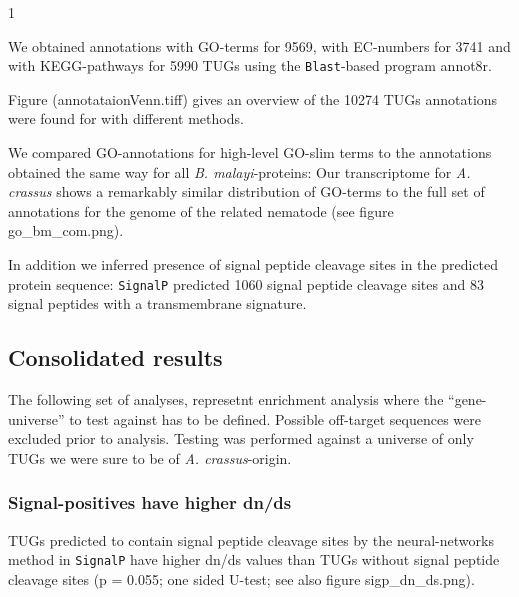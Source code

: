 \documentclass[10pt]{bmc_article}
\newenvironment{bmcformat}{\begin{raggedright}\baselineskip20pt\sloppy\setboolean{publ}{false}}{\end{raggedright}\baselineskip20pt\sloppy}
\begin{document}
\begin{bmcformat}



\begin{Schunk}
\begin{Soutput}
[1] 1
\end{Soutput}
\end{Schunk}



We obtained annotations with GO-terms for 9569, with EC-numbers
for 3741 and with KEGG-pathways for 5990 TUGs using
the \texttt{Blast}-based program annot8r.

Figure (annotataionVenn.tiff) gives an overview of the
10274 TUGs annotations were found for with
different methods.


We compared GO-annotations for high-level GO-slim terms to the
annotations obtained the same way for all \textit{B. malayi}-proteins:
Our transcriptome for \textit{A. crassus} shows a remarkably similar
distribution of GO-terms to the full set of annotations for the genome
of the related nematode (see figure go\_bm\_com.png).

In addition we inferred presence of signal peptide cleavage sites in
the predicted protein sequence: \texttt{SignalP} \cite{pmid21959131}
predicted 1060 signal peptide cleavage sites and
83 signal peptides with a transmembrane signature.

\subsection*{Consolidated results}







The following set of analyses, represetnt enrichment analysis where
the ``gene-universe'' to test against has to be defined. Possible
off-target sequences were excluded prior to analysis. Testing was
performed against a universe of only TUGs we were sure to be of
\textit{A. crassus}-origin.

\subsubsection*{Signal-positives have higher dn/ds}

TUGs predicted to contain signal peptide cleavage sites by the
neural-networks method in \texttt{SignalP} have higher dn/ds values
than TUGs without signal peptide cleavage sites (p =
0.055; one sided U-test; see also
figure sigp\_dn\_ds.png).


\end{bmcformat}
\end{document}
